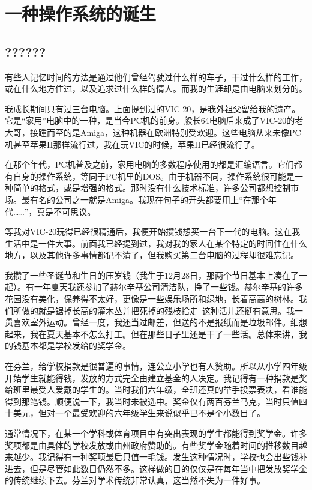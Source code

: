 \chapter{一种操作系统的诞生}
\section{??????}

有些人记忆时间的方法是通过他们曾经驾驶过什么样的车子，干过什么样的工作，或在什么地方住过，以及追求过什么样的情人。而我的生涯却是由电脑来划分的。

我成长期间只有过三台电脑。上面提到过的VIC-20，是我外祖父留给我的遗产。它是“家用”电脑中的一种，是当今PC机的前身。般长64电脑后来成了VIC-20的老大哥，接踵而至的是Amiga，这种机器在欧洲特别受欢迎。这些电脑从来未像PC机甚至苹果II那样流行过，我在玩VIC的时候，苹果II已经很流行了。

在那个年代，PC机普及之前，家用电脑的多数程序使用的都是汇编语言。它们都有自身的操作系统，等同于PC机里的DOS。由于机器不同，操作系统很可能是一种简单的格式，或是增强的格式。那时没有什么技术标准，许多公司都想控制市场。最有名的公司之一就是Amiga。我现在句子的开头都要用上“在那个年代……”，真是不可思议。

等我对VIC-20玩得已经很精通后，我便开始攒钱想买一台下一代的电脑。这在我生活中是一件大事。前面我已经提到过，我对我的家人在某个特定的时间住在什么地方，以及其他许多事情都记不清了，但我购买第二台电脑的过程却很难忘记。

我攒了一些圣诞节和生日的压岁钱（我生于12月28日，那两个节日基本上凑在了一起）。有一年夏天我还参加了赫尔辛基公司清洁队，挣了一些钱。赫尔辛基的许多花园没有美化，保养得不太好，更像是一些娱乐场所和绿地，长着高高的树林。我们所做的就是锯掉长高的灌木丛并把死掉的残枝拾走--这种活儿还挺有意思。我一贯喜欢室外运动。曾经一度，我还当过邮差，但送的不是报纸而是垃圾邮件。细想起来，我在夏天基本不怎么打工。但在那些日子里还是干了一些活。总体来讲，我的钱基本都是学校发给的奖学金。

在芬兰，给学校捐款是很普遍的事情，连公立小学也有人赞助。所以从小学四年级开始学生就能得钱，发放的方式完全由建立基金的人决定。我记得有一种捐款是奖给班里最受人爱戴的学生的。当时我们六年级，全班还真的举手投票表决，看谁能得到那笔钱。顺便说一下，我当时未被选中。奖金仅有两百芬兰马克，当时只值四十美元，但对一个最受欢迎的六年级学生来说似乎已不是个小数目了。

通常情况下，在某一个学科或体育项目中有突出表现的学生都能得到奖学金。许多奖项都是由具体的学校发放或由州政府赞助的。有些奖学金随着时间的推移数目越来越少。我记得有一种奖项最后只值一毛钱。发生这种情况时，学校也会出些钱补进去，但是尽管如此数目仍然不多。这样做的目的仅仅是在每年当中把发放奖学金的传统继续下去。芬兰对学术传统非常认真，这当然不失为一件好事。

